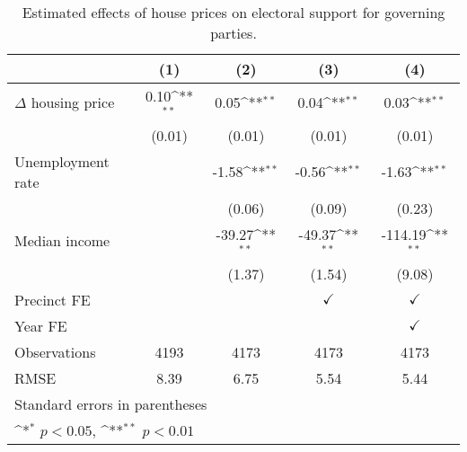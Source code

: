 \begin{table}[htbp]\centering
\def\sym#1{\ifmmode^{#1}\else\(^{#1}\)\fi}
\caption{Estimated effects of house prices on electoral support for governing parties.} \label{tab1}
\begin{tabular}{l*{4}{c}}
\hline\hline
                    &\multicolumn{1}{c}{(1)}        &\multicolumn{1}{c}{(2)}        &\multicolumn{1}{c}{(3)}        &\multicolumn{1}{c}{(4)}        \\
\hline
$\Delta$ housing price&        0.10\sym{**}&        0.05\sym{**}&        0.04\sym{**}&        0.03\sym{**}\\
                    &      (0.01)        &      (0.01)        &      (0.01)        &      (0.01)        \\
[1em]
Unemployment rate   &                    &       -1.58\sym{**}&       -0.56\sym{**}&       -1.63\sym{**}\\
                    &                    &      (0.06)        &      (0.09)        &      (0.23)        \\
[1em]
Median income       &                    &      -39.27\sym{**}&      -49.37\sym{**}&     -114.19\sym{**}\\
                    &                    &      (1.37)        &      (1.54)        &      (9.08)        \\
[1em]
\hline Precinct FE  &                    &                    &$\checkmark$        &$\checkmark$        \\
[1em]
Year FE             &                    &                    &                    &$\checkmark$        \\
\hline
Observations        &        4193        &        4173        &        4173        &        4173        \\
RMSE                &        8.39        &        6.75        &        5.54        &        5.44        \\
\hline\hline
\multicolumn{5}{l}{\footnotesize Standard errors in parentheses}\\
\multicolumn{5}{l}{\footnotesize \sym{*} \(p<0.05\), \sym{**} \(p<0.01\)}\\
\end{tabular}
\end{table}
